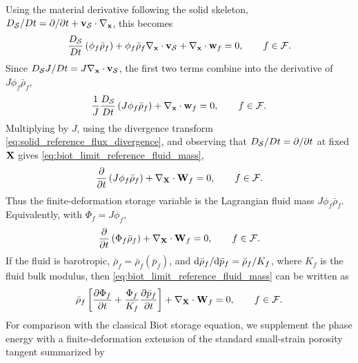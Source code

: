 %
Using the material derivative following the solid skeleton,
\(D_{\mathcal{S}}/Dt=\partial/\partial t+\mathbf{v}_{\mathcal{S}}\cdot\nabla_{\mathbf{x}}\), this
becomes
%
\begin{equation}
	\frac{D_{\mathcal{S}}}{Dt}\left(\phi_f\bar\rho_f\right)
	+\phi_f\bar\rho_f\nabla_{\mathbf{x}}\cdot\mathbf{v}_{\mathcal{S}}
	+\nabla_{\mathbf{x}}\cdot\mathbf{w}_f
	=0,
	\qquad
	f\in\mathcal{F} .
	\label{eq:biot_limit_solid_derivative_fluid_mass_balance}
\end{equation}
%
Since \({D_{\mathcal{S}}J}/{Dt}=J\nabla_{\mathbf{x}}\cdot\mathbf{v}_{\mathcal{S}}\), the first two terms
combine into the derivative of \(J\phi_f\bar\rho_f\),
%
\begin{equation}
	\frac{1}{J}\frac{D_{\mathcal{S}}}{Dt}
	\left(J\phi_f\bar\rho_f\right)
	+\nabla_{\mathbf{x}}\cdot\mathbf{w}_f
	=0,
	\qquad
	f\in\mathcal{F} .
	\label{eq:biot_limit_jacobian_current_mass_balance}
\end{equation}
%
Multiplying by \(J\), using the divergence transform
\eqref{eq:solid_reference_flux_divergence}, and observing that
\(D_{\mathcal{S}}/Dt=\partial/\partial t\) at fixed \(\mathbf{X}\) gives
\eqref{eq:biot_limit_reference_fluid_mass},
%
\begin{equation}
	\frac{\partial}{\partial t}
	\left(J\phi_f\bar\rho_f\right)
	+\nabla_{\mathbf{X}}\cdot\mathbf{W}_f
	=0,
	\qquad
	f\in\mathcal{F} .
	\label{eq:biot_limit_reference_fluid_mass}
\end{equation}
%
Thus the finite-deformation storage variable is the Lagrangian fluid mass
\(J\phi_f\bar\rho_f\).  Equivalently, with \(\Phi_f=J\phi_f\),
%
\begin{equation}
	\frac{\partial}{\partial t}\left(\Phi_f\bar\rho_f\right)
	+\nabla_{\mathbf{X}}\cdot\mathbf{W}_f
	=0,
	\qquad
	f\in\mathcal{F} .
	\label{eq:biot_limit_lagrangian_pore_volume_mass_balance}
\end{equation}
%
If the fluid is barotropic, \(\bar\rho_f=\bar\rho_f\left(\bar p_f\right)\), and
\({\rm d}\bar\rho_f/{\rm d}\bar p_f=\bar\rho_f/K_f\), where \(K_f\) is the
fluid bulk modulus, then
\eqref{eq:biot_limit_reference_fluid_mass} can be written as
%
\begin{equation}
	\bar\rho_f
	\left[
		\frac{\partial \Phi_f}{\partial t}
		+\frac{\Phi_f}{K_f}
		\frac{\partial \bar p_f}{\partial t}
	\right]
	+\nabla_{\mathbf{X}}\cdot\mathbf{W}_f
	=0,
	\qquad
	f\in\mathcal{F} .
	\label{eq:biot_limit_barotropic_storage_balance}
\end{equation}
%
For comparison with the classical Biot storage equation, we supplement the
phase energy with a finite-deformation extension of the standard small-strain
porosity tangent summarized by
